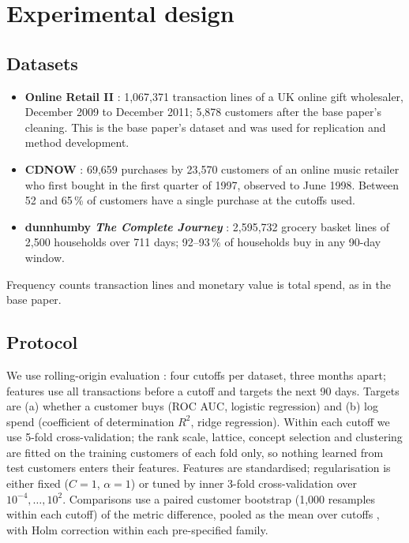 \section{Experimental design}\label{sec:design}

\subsection{Datasets}\label{sec:data}

\begin{itemize}
\item \textbf{Online Retail II} \citep{chen2019uci}: 1,067,371 transaction lines of a UK online gift wholesaler, December 2009 to December 2011; 5,878 customers after the base paper's cleaning. This is the base paper's dataset and was used for replication and method development.
\item \textbf{CDNOW} \citep{fader2005}: 69,659 purchases by 23,570 customers of an online music retailer who first bought in the first quarter of 1997, observed to June 1998. Between 52 and 65\,\% of customers have a single purchase at the cutoffs used.
\item \textbf{dunnhumby \emph{The Complete Journey}} \citep{dunnhumby}: 2,595,732 grocery basket lines of 2,500 households over 711 days; 92--93\,\% of households buy in any 90-day window.
\end{itemize}
Frequency counts transaction lines and monetary value is total spend, as in the base paper.

\subsection{Protocol}\label{sec:protocol}

We use rolling-origin evaluation \citep{tashman2000}: four cutoffs per dataset, three months apart; features use all transactions before a cutoff and targets the next 90 days. Targets are (a) whether a customer buys (ROC AUC, logistic regression) and (b) log spend (coefficient of determination $R^2$, ridge regression). Within each cutoff we use 5-fold cross-validation; the rank scale, lattice, concept selection and clustering are fitted on the training customers of each fold only, so nothing learned from test customers enters their features. Features are standardised; regularisation is either fixed ($C=1$, $\alpha=1$) or tuned by inner 3-fold cross-validation over $10^{-4},\dots,10^{2}$. Comparisons use a paired customer bootstrap (1,000 resamples within each cutoff) of the metric difference, pooled as the mean over cutoffs \citep{efron1993}, with Holm correction \citep{holm1979} within each pre-specified family.

